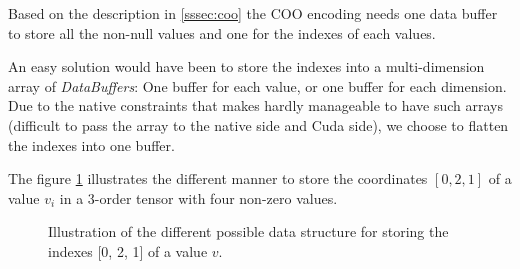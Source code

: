 Based on the description in \ref{sssec:coo} the COO encoding needs one data buffer to store all the non-null values and one for the indexes of each values. 

An easy solution would have been to store the indexes into a multi-dimension array of \textit{DataBuffers}: One buffer for each value, or one buffer for each dimension. Due to the native constraints that makes hardly manageable to have such arrays (difficult to pass the array to the native side and Cuda side), we choose to flatten the indexes into one buffer.

The figure \ref{fig:datastoring} illustrates the different manner to store the coordinates $[0, 2, 1]$ of a value $v_{i}$ in a 3-order tensor with four non-zero values.

\begin{figure}[h]
	\centering
	\quad
	\quad
	\hfill
	\caption{Illustration of the different possible data structure for storing the indexes  [0, 2, 1] of a value $v$. }
	\label{fig:datastoring}
\end{figure}


